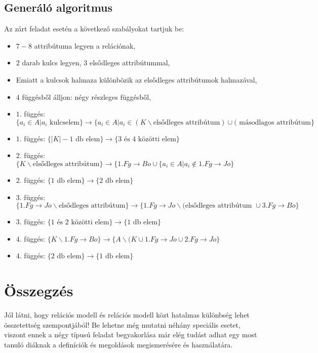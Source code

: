 \subsection{Generáló algoritmus}
Az zárt feladat esetén a következő szabályokat tartjuk be:
\begin{itemize}
    \item $7-8$ attribútuma legyen a relációnak,
    \item $2$ darab kulcs legyen, $3$ elsődleges attribútummal, 
    \item Emiatt a kulcsok halmaza különbözik az elsődleges attribútumok halmazával,
    \item $4$ függésből álljon: négy részleges függésből,
    \item $1.$ függés: $\big\{ a_i \in A \big| a_i \text{ kulcselem}  \big\} \longrightarrow \big\{  a_i \in A \big| a_i \in (K \backslash \text{elsődleges attribútum}) \cup (\text{ másodlagos attribútum}   \big\}$ 
    \item $1.$ függés: $\big \{ |K|-1 \text{ db elem} \big\} \longrightarrow \big\{ 3 \text{ és } 4 \text{ közötti elem} \big \}$
    \item $2.$ függés: $\big\{ K \backslash \text{elsődleges attribútum} \big\} \longrightarrow \big\{ 1.Fg \rightarrow Bo \cup \{ a_i \in A \big| a_i \not \in 1.Fg \rightarrow Jo  \big\}$ 
    \item $2.$ függés: $\big \{ 1 \text{ db elem} \big\} \longrightarrow \big\{ 2 \text{ db elem} \big \}$
    \item $3.$ függés: $\big\{  1.Fg \rightarrow Jo \backslash \text{elsődleges attribútum} \big\} \longrightarrow \big\{ 1.Fg \rightarrow Jo \backslash (\text{elsődleges attribútum } \cup 3.Fg \rightarrow Bo  \big \}$
    \item $3.$ függés: $\big \{ 1 \text{ és } 2 \text{ közötti elem} \big\} \longrightarrow \big\{1 \text{ db elem} \big \}$
    \item $4.$ függés: $\big\{ K \backslash 1.Fg \rightarrow Bo \big\} \longrightarrow \big\{ A \backslash (K \cup 1.Fg \rightarrow Jo \cup 2.Fg \rightarrow Jo  \big \}$
    \item $4.$ függés: $\big \{ 2 \text{ db elem} \big\} \longrightarrow \big\{1 \text{ db elem} \big \}$
\end{itemize}

\section{Összegzés}

Jól látni, hogy relációs modell és relációs modell közt hatalmas különbség lehet összetettség szempontjából! Be lehetne még mutatni néhány speciális esetet, viszont ennek a négy típusú feladat begyakorlása már elég tudást adhat egy most tanuló diáknak a definíciók és megoldások megismerésére és használatára. 